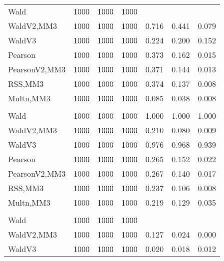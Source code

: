 \documentclass[
]{article}
\begin{document}
\begin{table}[H]
{\begin{tabular}[t]{lrrrrrr}
\hspace{1em}Wald & 1000 & 1000 & 1000 &  &  \vphantom{1} & \\
\hspace{1em}WaldV2,MM3 & 1000 & 1000 & 1000 & 0.716 & 0.441 & 0.079\\
\hspace{1em}WaldV3 & 1000 & 1000 & 1000 & 0.224 & 0.200 & 0.152\\
\hspace{1em}Pearson & 1000 & 1000 & 1000 & 0.373 & 0.162 & 0.015\\
\hspace{1em}PearsonV2,MM3 & 1000 & 1000 & 1000 & 0.371 & 0.144 & 0.013\\
\hspace{1em}RSS,MM3 & 1000 & 1000 & 1000 & 0.374 & 0.137 & 0.008\\
\hspace{1em}Multn,MM3 & 1000 & 1000 & 1000 & 0.085 & 0.038 & 0.008\\
\addlinespace[0.3em]
\multicolumn{7}{l}{\textbf{2F 10V}}\\
\hspace{1em}Wald & 1000 & 1000 & 1000 & 1.000 & 1.000 & 1.000\\
\hspace{1em}WaldV2,MM3 & 1000 & 1000 & 1000 & 0.210 & 0.080 & 0.009\\
\hspace{1em}WaldV3 & 1000 & 1000 & 1000 & 0.976 & 0.968 & 0.939\\
\hspace{1em}Pearson & 1000 & 1000 & 1000 & 0.265 & 0.152 & 0.022\\
\hspace{1em}PearsonV2,MM3 & 1000 & 1000 & 1000 & 0.267 & 0.140 & 0.017\\
\hspace{1em}RSS,MM3 & 1000 & 1000 & 1000 & 0.237 & 0.106 & 0.008\\
\hspace{1em}Multn,MM3 & 1000 & 1000 & 1000 & 0.219 & 0.129 & 0.035\\
\addlinespace[0.3em]
\multicolumn{7}{l}{\textbf{3F 15V}}\\
\hspace{1em}Wald & 1000 & 1000 & 1000 &  &  & \\
\hspace{1em}WaldV2,MM3 & 1000 & 1000 & 1000 & 0.127 & 0.024 & 0.000\\
\hspace{1em}WaldV3 & 1000 & 1000 & 1000 & 0.020 & 0.018 & 0.012\\

\end{tabular}}
\end{table}
\end{document}
